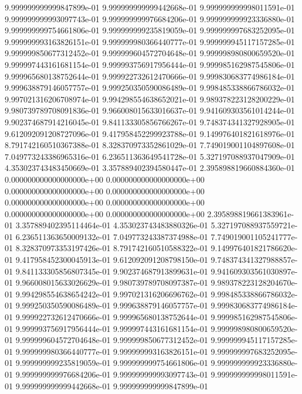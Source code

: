 9.999999999999847899e-01	9.999999999999442668e-01	9.999999999998011591e-01	9.999999999993097743e-01	9.999999999976684206e-01	9.999999999923336880e-01	9.999999999754661806e-01	9.999999999235819059e-01	9.999999997683252095e-01	9.999999993163826151e-01	9.999999980366440777e-01	9.999999945117157285e-01	9.999999850677312452e-01	9.999999604572704648e-01	9.999998980800659520e-01	9.999997443161681154e-01	9.999993756917956444e-01	9.999985162987545806e-01	9.999965680138752644e-01	9.999922732612470666e-01	9.999830683774986184e-01	9.999638879146057757e-01	9.999250350590086489e-01	9.998485338866786032e-01	9.997021316206708974e-01	9.994298554638652021e-01	9.989378223128200229e-01	9.980739789708091836e-01	9.966008015633016637e-01	9.941609303561014244e-01	9.902374687914216045e-01	9.841133305856766267e-01	9.748374341327928905e-01	9.612092091208727096e-01	9.417958452299923788e-01	9.149976401821618976e-01	8.791742160510367388e-01	8.328370973352861029e-01	7.749019001104897608e-01	7.049773243386965316e-01	6.236511363649541728e-01	5.327197088937047909e-01	4.353023743483450669e-01	3.357889402394580447e-01	2.395898819660884360e-01	0.000000000000000000e+00	0.000000000000000000e+00	0.000000000000000000e+00	0.000000000000000000e+00	0.000000000000000000e+00	0.000000000000000000e+00	0.000000000000000000e+00	0.000000000000000000e+00	2.395898819661383961e-01	3.357889402395114464e-01	4.353023743483880326e-01	5.327197088937559721e-01	6.236511363650009132e-01	7.049773243387374988e-01	7.749019001105241777e-01	8.328370973353197426e-01	8.791742160510588322e-01	9.149976401821786620e-01	9.417958452300045913e-01	9.612092091208798150e-01	9.748374341327988857e-01	9.841133305856807345e-01	9.902374687913899631e-01	9.941609303561030897e-01	9.966008015633026629e-01	9.980739789708097387e-01	9.989378223128204670e-01	9.994298554638654242e-01	9.997021316206696762e-01	9.998485338866786032e-01	9.999250350590086489e-01	9.999638879146057757e-01	9.999830683774986184e-01	9.999922732612470666e-01	9.999965680138752644e-01	9.999985162987545806e-01	9.999993756917956444e-01	9.999997443161681154e-01	9.999998980800659520e-01	9.999999604572704648e-01	9.999999850677312452e-01	9.999999945117157285e-01	9.999999980366440777e-01	9.999999993163826151e-01	9.999999997683252095e-01	9.999999999235819059e-01	9.999999999754661806e-01	9.999999999923336880e-01	9.999999999976684206e-01	9.999999999993097743e-01	9.999999999998011591e-01	9.999999999999442668e-01	9.999999999999847899e-01
